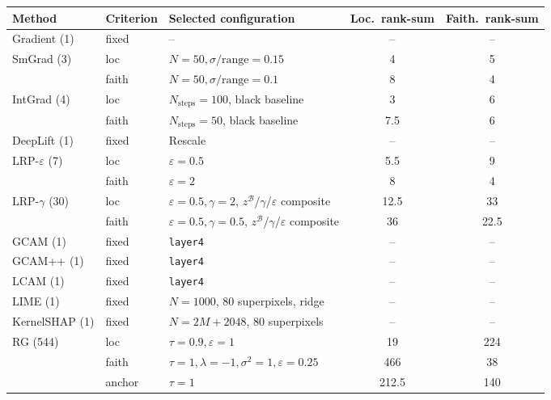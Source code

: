 \begin{tabular}{@{}l l l c c@{}}
\toprule
Method & Criterion & Selected configuration & Loc.\ rank-sum & Faith.\ rank-sum \\
\midrule
Gradient (1) & fixed & -- & -- & -- \\
\addlinespace
SmGrad (3) & loc & $N{=}50,\sigma/\mathrm{range}{=}0.15$ & 4 & 5 \\
 & faith & $N{=}50,\sigma/\mathrm{range}{=}0.1$ & 8 & 4 \\
\addlinespace
IntGrad (4) & loc & $N_{\mathrm{steps}}{=}100$, black baseline & 3 & 6 \\
 & faith & $N_{\mathrm{steps}}{=}50$, black baseline & 7.5 & 6 \\
\addlinespace
DeepLift (1) & fixed & Rescale & -- & -- \\
\addlinespace
LRP-$\varepsilon$ (7) & loc & $\varepsilon{=}0.5$ & 5.5 & 9 \\
 & faith & $\varepsilon{=}2$ & 8 & 4 \\
\addlinespace
LRP-$\gamma$ (30) & loc & $\varepsilon{=}0.5,\gamma{=}2$, $z^{\mathcal{B}}$/$\gamma$/$\varepsilon$ composite & 12.5 & 33 \\
 & faith & $\varepsilon{=}0.5,\gamma{=}0.5$, $z^{\mathcal{B}}$/$\gamma$/$\varepsilon$ composite & 36 & 22.5 \\
\addlinespace
GCAM (1) & fixed & \texttt{layer4} & -- & -- \\
\addlinespace
GCAM++ (1) & fixed & \texttt{layer4} & -- & -- \\
\addlinespace
LCAM (1) & fixed & \texttt{layer4} & -- & -- \\
\addlinespace
LIME (1) & fixed & $N{=}1000$, 80 superpixels, ridge & -- & -- \\
\addlinespace
KernelSHAP (1) & fixed & $N{=}2M{+}2048$, 80 superpixels & -- & -- \\
\addlinespace
RG (544) & loc & $\tau{=}0.9,\varepsilon{=}1$ & 19 & 224 \\
 & faith & $\tau{=}1,\lambda{=}{-}1,\sigma^2{=}1,\varepsilon{=}0.25$ & 466 & 38 \\
 & anchor & $\tau{=}1$ & 212.5 & 140 \\
\bottomrule
\end{tabular}
